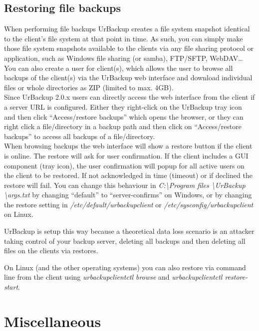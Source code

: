 \documentclass[a4paper,10pt]{article}
\begin{document}
\subsection{Restoring file backups}

When performing file backups UrBackup creates a file system snapshot identical to the client's file system at that point in time. As such, you can simply make those file system snapshots available to the clients via any file sharing protocol or application, such as Windows file sharing (or samba), FTP/SFTP, WebDAV\ldots\\

You can also create a user for client(s), which allows the user to browse all backups of the client(s) via the UrBackup web interface and download individual files or whole directories as ZIP (limited to max. 4GB).\\

Since UrBackup 2.0.x users can directly access the web interface from the client if a server URL is configured. Either they right-click on the UrBackup tray icon and then click ``Access/restore backups'' which opens the browser, or they can right click a file/directory in a backup path and then click on ``Access/restore backups'' to access all backups of a file/directory.\\

When browsing backups the web interface will show a restore button if the client is online. The restore will ask for user confirmation. If the client includes a GUI component (tray icon), the user confirmation will popup for all active users on the client to be restored. If not acknowledged in time (timeout) or if declined the restore will fail. 
You can change this behaviour in \textsl{C:\textbackslash Program files \textbackslash UrBackup \textbackslash args.txt} by changing ``default'' to ``server-confirms'' on Windows, or by changing the restore setting in \textsl{/etc/default/urbackupclient} or \textsl{/etc/sysconfig/urbackupclient} on Linux.

UrBackup is setup this way because a theoretical data loss scenario is an attacker taking control of your backup server, deleting all backups and then deleting all files on the clients via restores.  

On Linux (and the other operating systems) you can also restore via command line from the client using \textsl{urbackupclientctl browse} and \textsl{urbackupclientctl restore-start}.

\section{Miscellaneous}
\end{document}
